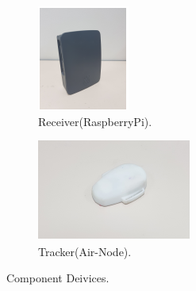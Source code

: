 \begin{figure}[h!]
\centering
\begin{subfigure}[b]{0.4\linewidth}
\includegraphics[width=\linewidth]{Image/rasp.png}
\caption{Receiver(RaspberryPi).}
\end{subfigure}
\begin{subfigure}[b]{0.4\linewidth}
\includegraphics[width=\linewidth]{Image/tracker.png}
\caption{Tracker(Air-Node).}
\end{subfigure}
\caption{Component Deivices.}
\label{fig:component}
\end{figure}


